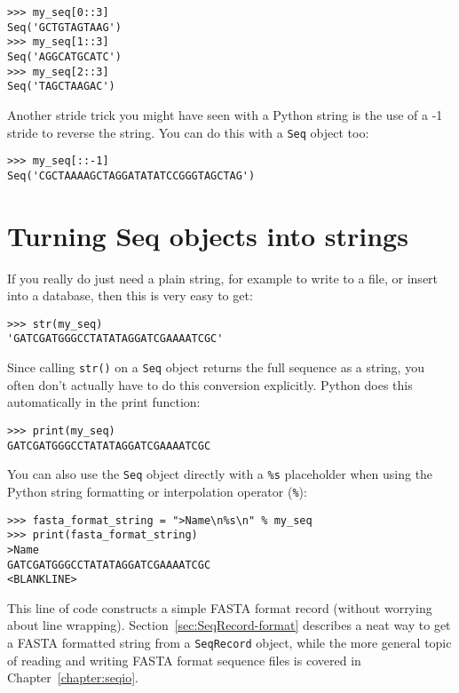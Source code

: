 \begin{verbatim}
>>> my_seq[0::3]
Seq('GCTGTAGTAAG')
>>> my_seq[1::3]
Seq('AGGCATGCATC')
>>> my_seq[2::3]
Seq('TAGCTAAGAC')
\end{verbatim}

Another stride trick you might have seen with a Python string is the use of a -1 stride to reverse the string.  You can do this with a \verb|Seq| object too:

\begin{verbatim}
>>> my_seq[::-1]
Seq('CGCTAAAAGCTAGGATATATCCGGGTAGCTAG')
\end{verbatim}

\section{Turning Seq objects into strings}
\label{sec:seq-to-string}

If you really do just need a plain string, for example to write to a file, or insert into a database, then this is very easy to get:

\begin{verbatim}
>>> str(my_seq)
'GATCGATGGGCCTATATAGGATCGAAAATCGC'
\end{verbatim}

Since calling \verb|str()| on a \verb|Seq| object returns the full sequence as a string,
you often don't actually have to do this conversion explicitly.
Python does this automatically in the print function:

\begin{verbatim}
>>> print(my_seq)
GATCGATGGGCCTATATAGGATCGAAAATCGC
\end{verbatim}

You can also use the \verb|Seq| object directly with a \verb|%s| placeholder when using the Python string formatting or interpolation operator (\verb|%|):

\begin{verbatim}
>>> fasta_format_string = ">Name\n%s\n" % my_seq
>>> print(fasta_format_string)
>Name
GATCGATGGGCCTATATAGGATCGAAAATCGC
<BLANKLINE>
\end{verbatim}

\noindent This line of code constructs a simple FASTA format record (without worrying about line wrapping).
Section~\ref{sec:SeqRecord-format} describes a neat way to get a FASTA formatted
string from a \verb|SeqRecord| object, while the more general topic of reading and
writing FASTA format sequence files is covered in Chapter~\ref{chapter:seqio}.

